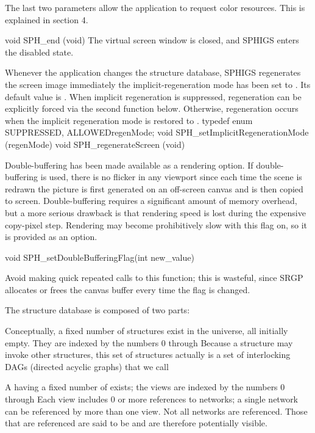 \newpar
The last two parameters allow the application to request color resources.  This
is explained in section 4.


\nextsynopsis
void SPH_end (void)
\endsynopsis
The virtual screen window is closed, and SPHIGS enters the disabled state.


Whenever the application changes the structure database, SPHIGS regenerates the
screen image immediately
 the implicit-regeneration mode has been set to 
.  Its
default value is .  When implicit regeneration is suppressed,
regeneration can be explicitly forced via the second function below.
Otherwise, regeneration occurs when the implicit regeneration mode is restored
to .
\begincode
typedef enum \lb{}SUPPRESSED, ALLOWED\rb regenMode;
void SPH_setImplicitRegenerationMode (regenMode)
void SPH_regenerateScreen (void)
\endcode

\newpar
Double-buffering has been made available as a rendering option.  If
double-buffering is used, there is no flicker in any viewport since
each time the scene is redrawn the picture is first generated on an
off-screen canvas and is then copied to screen.  Double-buffering
requires a significant amount of memory overhead, but a more serious
drawback is that rendering speed is lost during the expensive
copy-pixel step.  Rendering may become prohibitively slow with this
flag on, so it is provided as an option.

\begincode
void SPH_setDoubleBufferingFlag(int new_value)
\endcode

Avoid making quick repeated calls to this function; this is
wasteful, since SRGP allocates or frees the canvas buffer every time
the flag is changed.


The structure database is composed of two parts:

\bullitem Conceptually, a fixed number of structures exist in the universe, all
initially empty.  They are indexed by the numbers 0 through
  Because a structure may invoke other
structures, this set of structures actually is a set of interlocking
DAGs (directed acyclic graphs) that we call 

\bullitem A  having a fixed number of 
exists; the views are indexed by the numbers 0 through
  Each view includes 0 or more references
to networks; a single network can be referenced by more than
one view.  Not all networks are referenced.  Those that are referenced
are said to be  and are therefore potentially visible.

